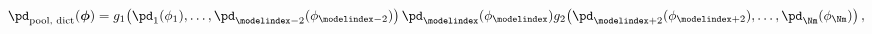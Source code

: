 \begin{equation}
  \pd_{\text{pool, dict}}(\boldsymbol{\phi}) = 
    g_{1}\!\left(\pd_{1}(\phi_{1}), \ldots, \pd_{\modelindex - 2}(\phi_{\modelindex - 2})\right)
    \pd_{\modelindex}(\phi_{\modelindex})
    g_{2}\!\left(\pd_{\modelindex + 2}(\phi_{\modelindex + 2}), \ldots, \pd_{\Nm}(\phi_{\Nm})\right),
  \label{eqn:dictatorial-one-submodel}
\end{equation}